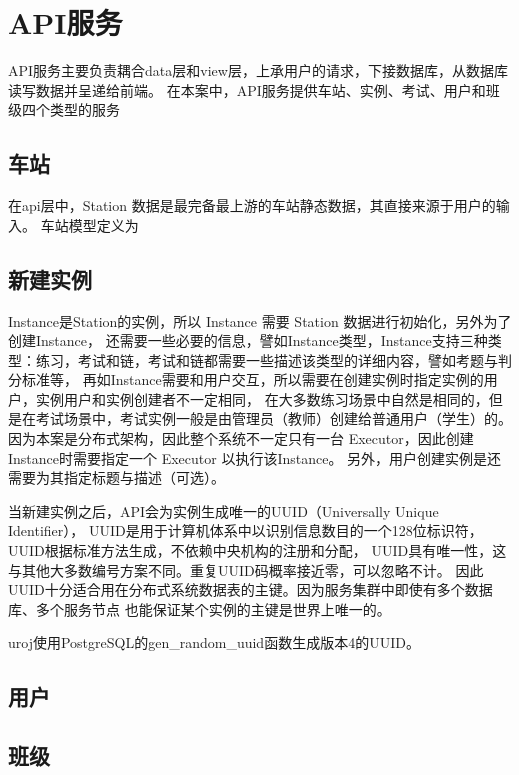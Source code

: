 \section{API服务}
API服务主要负责耦合data层和view层，上承用户的请求，下接数据库，从数据库读写数据并呈递给前端。
在本案中，API服务提供车站、实例、考试、用户和班级四个类型的服务
\subsection{车站}
在api层中，Station 数据是最完备最上游的车站静态数据，其直接来源于用户的输入。
车站模型定义为


\subsection{新建实例}
Instance是Station的实例，所以 Instance 需要 Station 数据进行初始化，另外为了创建Instance，
还需要一些必要的信息，譬如Instance类型，Instance支持三种类型：练习，考试和链，考试和链都需要一些描述该类型的详细内容，譬如考题与判分标准等，
再如Instance需要和用户交互，所以需要在创建实例时指定实例的用户，实例用户和实例创建者不一定相同，
在大多数练习场景中自然是相同的，但是在考试场景中，考试实例一般是由管理员（教师）创建给普通用户（学生）的。
因为本案是分布式架构，因此整个系统不一定只有一台 Executor，因此创建Instance时需要指定一个 Executor 以执行该Instance。
另外，用户创建实例是还需要为其指定标题与描述（可选）。

当新建实例之后，API会为实例生成唯一的UUID（Universally Unique Identifier），
UUID是用于计算机体系中以识别信息数目的一个128位标识符，
UUID根据标准方法生成，不依赖中央机构的注册和分配，
UUID具有唯一性，这与其他大多数编号方案不同。重复UUID码概率接近零，可以忽略不计。
因此UUID十分适合用在分布式系统数据表的主键。因为服务集群中即使有多个数据库、多个服务节点
也能保证某个实例的主键是世界上唯一的。

uroj使用PostgreSQL的gen\_random\_uuid函数生成版本4的UUID。

\subsection{用户}
\subsection{班级}